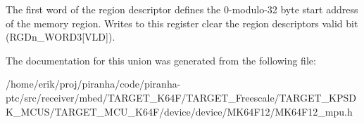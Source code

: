 The first word of the region descriptor defines the 0-\/modulo-\/32 byte start address of the memory region. Writes to this register clear the region descriptor\textquotesingle{}s valid bit (R\+G\+Dn\+\_\+\+W\+O\+R\+D3\mbox{[}V\+LD\mbox{]}). 

The documentation for this union was generated from the following file\+:\begin{DoxyCompactItemize}
\item 
/home/erik/proj/piranha/code/piranha-\/ptc/src/receiver/mbed/\+T\+A\+R\+G\+E\+T\+\_\+\+K64\+F/\+T\+A\+R\+G\+E\+T\+\_\+\+Freescale/\+T\+A\+R\+G\+E\+T\+\_\+\+K\+P\+S\+D\+K\+\_\+\+M\+C\+U\+S/\+T\+A\+R\+G\+E\+T\+\_\+\+M\+C\+U\+\_\+\+K64\+F/device/device/\+M\+K64\+F12/M\+K64\+F12\+\_\+mpu.\+h\end{DoxyCompactItemize}
